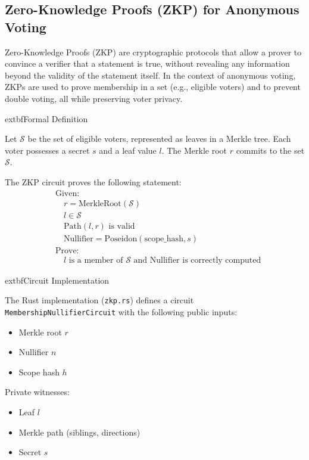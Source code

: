 \documentclass[12pt,a4paper]{report}
\begin{document}
\subsection{Zero-Knowledge Proofs (ZKP) for Anonymous Voting}

Zero-Knowledge Proofs (ZKP) are cryptographic protocols that allow a prover to convince a verifier that a statement is true, without revealing any information beyond the validity of the statement itself. In the context of anonymous voting, ZKPs are used to prove membership in a set (e.g., eligible voters) and to prevent double voting, all while preserving voter privacy.

	extbf{Formal Definition}

Let $\mathcal{S}$ be the set of eligible voters, represented as leaves in a Merkle tree. Each voter possesses a secret $s$ and a leaf value $l$. The Merkle root $r$ commits to the set $\mathcal{S}$.

The ZKP circuit proves the following statement:
\begin{align*}
  &\text{Given:} \\
  &\quad r = \text{MerkleRoot}(\mathcal{S}) \\
  &\quad l \in \mathcal{S} \\
  &\quad \text{Path}(l, r) \text{ is valid} \\
  &\quad \text{Nullifier} = \text{Poseidon}(\text{scope\_hash}, s) \\
  &\text{Prove:} \\
  &\quad l \text{ is a member of } \mathcal{S} \text{ and Nullifier is correctly computed}
\end{align*}

	extbf{Circuit Implementation}

The Rust implementation (\texttt{zkp.rs}) defines a circuit \texttt{MembershipNullifierCircuit} with the following public inputs:
\begin{itemize}
  \item Merkle root $r$
  \item Nullifier $n$
  \item Scope hash $h$
\end{itemize}
Private witnesses:
\begin{itemize}
  \item Leaf $l$
  \item Merkle path (siblings, directions)
  \item Secret $s$
\end{itemize}
\end{document}
